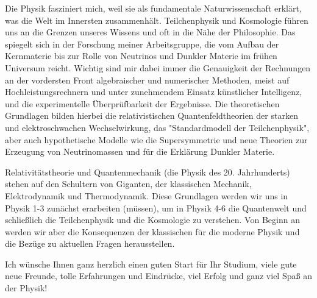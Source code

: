 \begin{multicols}{2}
Die Physik fasziniert mich, weil sie als fundamentale Naturwissenschaft erklärt, was die Welt im Innersten zusammenhält. Teilchenphysik und Kosmologie führen uns an die Grenzen unseres Wissens und oft in die Nähe der Philosophie. Das spiegelt sich in der Forschung meiner Arbeitsgruppe, die vom Aufbau der Kernmaterie bis zur Rolle von Neutrinos und Dunkler Materie im frühen Universum reicht. Wichtig sind mir dabei immer die Genauigkeit der Rechnungen an der vordersten Front algebraischer und numerischer Methoden, meist auf Hochleistungsrechnern und unter zunehmendem Einsatz künstlicher Intelligenz, und die experimentelle Überprüfbarkeit der Ergebnisse. Die theoretischen Grundlagen bilden hierbei die relativistischen Quantenfeldtheorien der starken und elektroschwachen Wechselwirkung, das "Standardmodell der Teilchenphysik", aber auch hypothetische Modelle wie die Supersymmetrie und neue Theorien zur Erzeugung von Neutrinomassen und für die Erklärung Dunkler Materie. 

Relativitätstheorie und Quantenmechanik (die Physik des 20. Jahrhunderts) stehen auf den Schultern von Giganten, der klassischen Mechanik, Elektrodynamik und Thermodynamik. Diese Grundlagen werden wir uns in Physik 1-3 zunächst erarbeiten (müssen), um in Physik 4-6 die Quantenwelt und schließlich die Teilchenphysik und die Kosmologie zu verstehen. Von Beginn an werden wir aber die Konsequenzen der klassischen für die moderne Physik und die Bezüge zu aktuellen Fragen herausstellen. 

Ich wünsche Ihnen ganz herzlich einen guten Start für Ihr Studium, viele gute neue Freunde, tolle Erfahrungen und Eindrücke, viel Erfolg und ganz viel Spaß an der Physik!

\end{multicols}

\newpage

